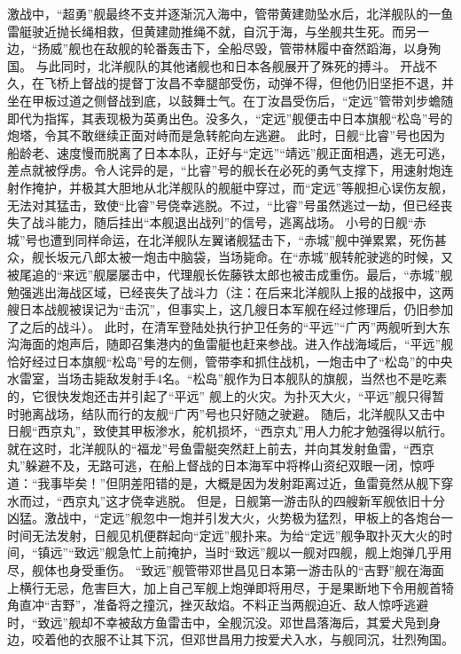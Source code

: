 \documentclass[12pt,UTF8]{ctexbook}
\begin{document}
激战中，“超勇”舰最终不支并逐渐沉入海中，管带黄建勋坠水后，北洋舰队的一鱼雷艇驶近抛长绳相救，但黄建勋推绳不就，自沉于海，与坐舰共生死。而另一边，“扬威”舰也在敌舰的轮番轰击下，全船尽毁，管带林履中奋然蹈海，以身殉国。
与此同时，北洋舰队的其他诸舰也和日本各舰展开了殊死的搏斗。
开战不久，在飞桥上督战的提督丁汝昌不幸腿部受伤，动弹不得，但他仍旧坚拒不退，并坐在甲板过道之侧督战到底，以鼓舞士气。在丁汝昌受伤后，“定远”管带刘步蟾随即代为指挥，其表现极为英勇出色。没多久，“定远”舰便击中日本旗舰“松岛”号的炮塔，令其不敢继续正面对峙而是急转舵向左逃避。
此时，日舰“比睿”号也因为船龄老、速度慢而脱离了日本本队，正好与“定远”“靖远”舰正面相遇，逃无可逃，差点就被俘虏。令人诧异的是，“比睿”号的舰长在必死的勇气支撑下，用速射炮连射作掩护，并极其大胆地从北洋舰队的舰艇中穿过，而“定远”等舰担心误伤友舰，无法对其猛击，致使“比睿”号侥幸逃脱。不过，“比睿”号虽然逃过一劫，但已经丧失了战斗能力，随后挂出“本舰退出战列”的信号，逃离战场。
小号的日舰“赤城”号也遭到同样命运，在北洋舰队左翼诸舰猛击下，“赤城”舰中弹累累，死伤甚众，舰长坂元八郎太被一炮击中脑袋，当场毙命。在“赤城”舰转舵驶逃的时候，又被尾追的“来远”舰屡屡击中，代理舰长佐藤铁太郎也被击成重伤。最后，“赤城”舰勉强逃出海战区域，已经丧失了战斗力（注：在后来北洋舰队上报的战报中，这两艘日本战舰被误记为“击沉”，但事实上，这几艘日本军舰在经过修理后，仍旧参加了之后的战斗）。
此时，在清军登陆处执行护卫任务的“平远”“广丙”两舰听到大东沟海面的炮声后，随即召集港内的鱼雷艇也赶来参战。进入作战海域后，“平远”舰恰好经过日本旗舰“松岛”号的左侧，管带李和抓住战机，一炮击中了“松岛”的中央水雷室，当场击毙敌发射手4名。“松岛”舰作为日本舰队的旗舰，当然也不是吃素的，它很快发炮还击并引起了“平远”
舰上的火灾。为扑灭大火，“平远”舰只得暂时驰离战场，结队而行的友舰“广丙”号也只好随之驶避。
随后，北洋舰队又击中日舰“西京丸”，致使其甲板渗水，舵机损坏，“西京丸”用人力舵才勉强得以航行。就在这时，北洋舰队的“福龙”号鱼雷艇突然赶上前去，并向其发射鱼雷，“西京丸”躲避不及，无路可逃，在船上督战的日本海军中将桦山资纪双眼一闭，惊呼道：“我事毕矣！”但阴差阳错的是，大概是因为发射距离过近，鱼雷竟然从舰下穿水而过，“西京丸”这才侥幸逃脱。
但是，日舰第一游击队的四艘新军舰依旧十分凶猛。激战中，“定远”舰忽中一炮并引发大火，火势极为猛烈，甲板上的各炮台一时间无法发射，日舰见机便群起向“定远”舰扑来。为给“定远”舰争取扑灭大火的时间，“镇远”“致远”舰急忙上前掩护，当时“致远”舰以一舰对四舰，舰上炮弹几乎用尽，舰体也身受重伤。
“致远”舰管带邓世昌见日本第一游击队的“吉野”舰在海面上横行无忌，危害巨大，加上自己军舰上炮弹即将用尽，于是果断地下令用舰首犄角直冲“吉野”，准备将之撞沉，挫灭敌焰。不料正当两舰迫近、敌人惊呼逃避时，“致远”舰却不幸被敌方鱼雷击中，全舰沉没。邓世昌落海后，其爱犬凫到身边，咬着他的衣服不让其下沉，但邓世昌用力按爱犬入水，与舰同沉，壮烈殉国。
\end{document}
